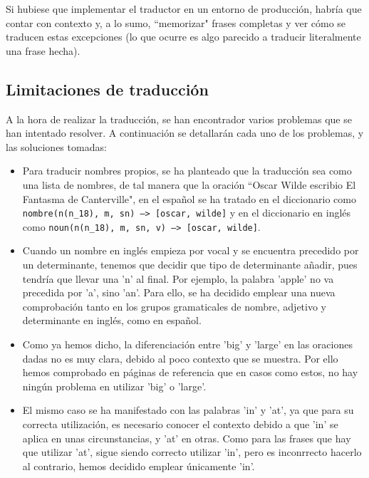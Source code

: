 \documentclass[a4paper]{article}
\begin{document}
        Si hubiese que implementar el traductor en un entorno de producción, habría que contar con contexto y, a lo sumo, ``memorizar" frases completas y ver cómo se traducen estas excepciones (lo que ocurre es algo parecido a traducir literalmente una frase hecha).

    \subsection*{Limitaciones de traducción}

        A la hora de realizar la traducción, se han encontrador varios problemas que se han intentado resolver. A continuación se detallarán cada uno de los problemas, y las soluciones tomadas:

        \begin{itemize}

            \item Para traducir nombres propios, se ha planteado que la traducción sea como una lista de nombres, de tal manera que la oración ``Oscar Wilde escribio El Fantasma de Canterville", en el español se ha tratado en el diccionario como \texttt{nombre(n(n\_18), m, sn) --> [oscar, wilde]} y en el diccionario en inglés como \texttt{noun(n(n\_18), m, sn, v) --> [oscar, wilde]}.

            \item Cuando un nombre en inglés empieza por vocal y se encuentra precedido por un determinante, tenemos que decidir que tipo de determinante añadir, pues tendría que llevar una 'n' al final. Por ejemplo, la palabra 'apple' no va precedida por 'a', sino 'an'. Para ello, se ha decidido emplear una nueva comprobación tanto en los grupos gramaticales de nombre, adjetivo y determinante en inglés, como en español.

            \item Como ya hemos dicho, la diferenciación entre 'big' y 'large' en las oraciones dadas no es muy clara, debido al poco contexto que se muestra. Por ello hemos comprobado en páginas de referencia que en casos como estos, no hay ningún problema en utilizar 'big' o 'large'.

            \item El mismo caso se ha manifestado con las palabras 'in' y 'at', ya que para su correcta utilización, es necesario conocer el contexto debido a que 'in' se aplica en unas circunstancias, y 'at' en otras. Como para las frases que hay que utilizar 'at', sigue siendo correcto utilizar 'in', pero es inconrrecto hacerlo al contrario, hemos decidido emplear únicamente 'in'.


\end{itemize}
\end{document}
